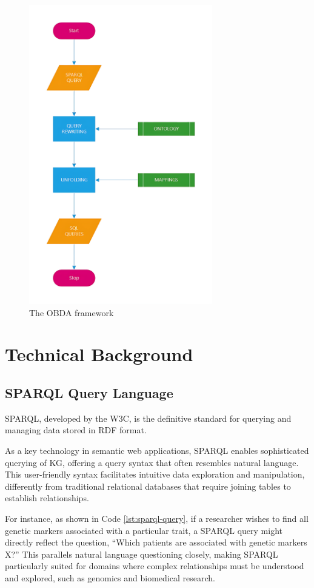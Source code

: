 \begin{figure}[ht]
    \centering
    \includegraphics[width=8cm]{res/obda_framework.png}
    \caption{The OBDA framework}
    \label{fig:OBDAframew}
\end{figure}


\section{Technical Background}
\subsection{SPARQL Query Language}
\ac{SPARQL}, developed by the \ac{W3C}, is the definitive standard for querying and managing data stored in \ac{RDF} format. 

As a key technology in semantic web applications, SPARQL enables sophisticated querying of \ac{KG}, offering a query syntax that often resembles natural language. This user-friendly syntax facilitates intuitive data exploration and manipulation, differently from traditional relational databases that require joining tables to establish relationships.

For instance, as shown in Code \ref{lst:sparql-query}, if a researcher wishes to find all genetic markers associated with a particular trait, a SPARQL query might directly reflect the question, “Which patients are associated with genetic markers X?” This parallels natural language questioning closely, making SPARQL particularly suited for domains where complex relationships must be understood and explored, such as genomics and biomedical research.

